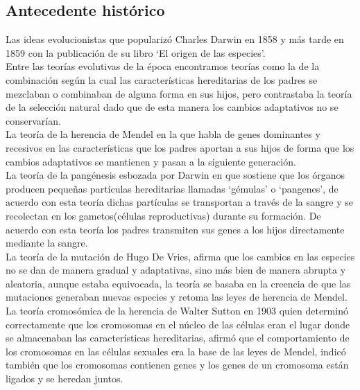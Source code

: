 		\subsection{Antecedente histórico}

		Las ideas evolucionistas que popularizó Charles Darwin en 1858 y más tarde en 1859 con la publicación de su libro ‘El origen de las especies’.\\

		Entre las teorías evolutivas de la época encontramos teorías como la de la combinación según la cual las características hereditarias de los padres se mezclaban o combinaban de alguna forma en sus hijos, pero contrastaba la teoría de la selección natural dado que de esta manera los cambios adaptativos no se conservarían.\\

		La teoría de la herencia de Mendel en la que habla de genes dominantes y recesivos en las características que los padres aportan a sus hijos de forma que los cambios adaptativos se mantienen y pasan a la siguiente generación.\\

		La teoría de la pangénesis esbozada por Darwin en que sostiene que los órganos producen pequeñas partículas hereditarias llamadas ‘gémulas’ o ‘pangenes’, de acuerdo con esta teoría dichas partículas se transportan a través de la sangre y se recolectan en los gametos(células reproductivas) durante su formación. De acuerdo con esta teoría los padres transmiten sus genes a los hijos directamente mediante la sangre.\\

		La teoría de la mutación de Hugo De Vries, afirma que los cambios en las especies no se dan de manera gradual y adaptativas, sino más bien de manera abrupta y aleatoria, aunque estaba equivocada, la teoría se basaba en la creencia de que las mutaciones generaban nuevas especies y retoma las leyes de herencia de Mendel.\\

		La teoría cromosómica de la herencia de Walter Sutton en 1903 quien determinó correctamente que los cromosomas en el núcleo de las células eran el lugar donde se almacenaban las características hereditarias, afirmó que el comportamiento de los cromosomas en las células sexuales era la base de las leyes de Mendel, indicó también que los cromosomas contienen genes y los genes de un cromosoma están ligados y se heredan juntos.\\

